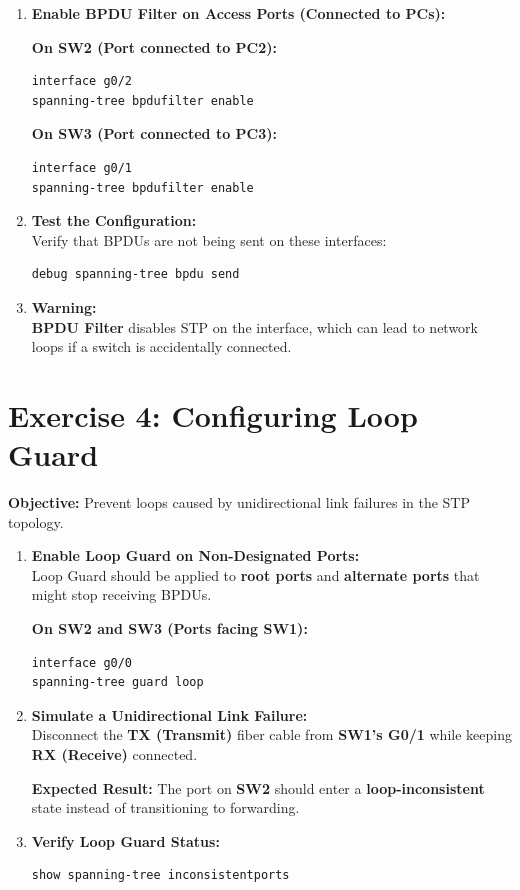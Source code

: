 \documentclass[a4paper]{book}
\begin{document}
\begin{enumerate} 
    \item \textbf{Enable BPDU Filter on Access Ports (Connected to PCs):}

    \textbf{On SW2 (Port connected to PC2):}
    \begin{verbatim}
interface g0/2
spanning-tree bpdufilter enable
    \end{verbatim}

    \textbf{On SW3 (Port connected to PC3):}
    \begin{verbatim}
interface g0/1
spanning-tree bpdufilter enable
    \end{verbatim}

    \item \textbf{Test the Configuration:} \\
    Verify that BPDUs are not being sent on these interfaces:
    \begin{verbatim}
debug spanning-tree bpdu send
    \end{verbatim}

    \item \textbf{Warning:} \\
    \textbf{BPDU Filter} disables STP on the interface, which can lead to network loops if a switch is accidentally connected.
\end{enumerate}

\section*{Exercise 4: Configuring Loop Guard}

\textbf{Objective:} Prevent loops caused by unidirectional link failures in the STP topology.

\begin{enumerate} 
    \item \textbf{Enable Loop Guard on Non-Designated Ports:} \\
    Loop Guard should be applied to \textbf{root ports} and \textbf{alternate ports} that might stop receiving BPDUs.

    \textbf{On SW2 and SW3 (Ports facing SW1):}
    \begin{verbatim}
interface g0/0
spanning-tree guard loop
    \end{verbatim}

    \item \textbf{Simulate a Unidirectional Link Failure:} \\
    Disconnect the \textbf{TX (Transmit)} fiber cable from \textbf{SW1’s G0/1} while keeping \textbf{RX (Receive)} connected.

    \textbf{Expected Result:} The port on \textbf{SW2} should enter a \textbf{loop-inconsistent} state instead of transitioning to forwarding.

    \item \textbf{Verify Loop Guard Status:}
    \begin{verbatim}
show spanning-tree inconsistentports
    \end{verbatim}
\end{enumerate}
\end{document}
